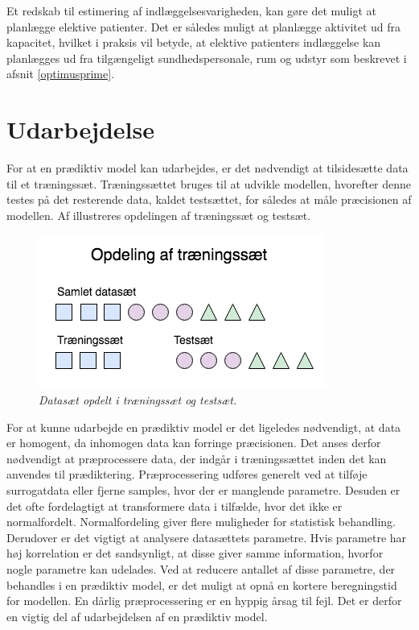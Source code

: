Et redskab til estimering af indlæggelsesvarigheden, kan gøre det muligt at planlægge elektive patienter. Det er således muligt at planlægge aktivitet ud fra kapacitet, hvilket i praksis vil betyde, at elektive patienters indlæggelse kan planlægges ud fra tilgængeligt sundhedspersonale, rum og udstyr som beskrevet i afsnit \ref{optimusprime}. 


\section{Udarbejdelse}
For at en prædiktiv model kan udarbejdes, er det nødvendigt at tilsidesætte data til et træningssæt. Træningssættet bruges til at udvikle modellen, hvorefter denne testes på det resterende data, kaldet testsættet, for således at måle præcisionen af modellen. Af  illustreres opdelingen af træningssæt og testsæt.

\begin{figure}[H]
	\centering
	\includegraphics[scale=.7]{figures/xval.png}
	\caption{\textit{Datasæt opdelt i træningssæt og testsæt.}\cite{Kuhn2013}}
	\label{traenings}
\end{figure}

\noindent
For at kunne udarbejde en prædiktiv model er det ligeledes nødvendigt, at data er homogent, da inhomogen data kan forringe præcisionen. 
Det anses derfor nødvendigt at præprocessere data, der indgår i træningssættet inden det kan anvendes til prædiktering.
Præprocessering udføres generelt ved at tilføje surrogatdata eller fjerne samples, hvor der er manglende parametre. Desuden er det ofte fordelagtigt at transformere data i tilfælde, hvor det ikke er normalfordelt. Normalfordeling giver flere muligheder for statistisk behandling.
Derudover er det vigtigt at analysere datasættets parametre. Hvis parametre har høj korrelation er det sandsynligt, at disse giver samme information, hvorfor nogle parametre kan udelades. Ved at reducere antallet af disse parametre, der behandles i en prædiktiv model, er det muligt at opnå en kortere beregningstid for modellen.
En dårlig præprocessering er en hyppig årsag til fejl. Det er derfor en vigtig del af udarbejdelsen af en prædiktiv model.\cite{Kuhn2013}


